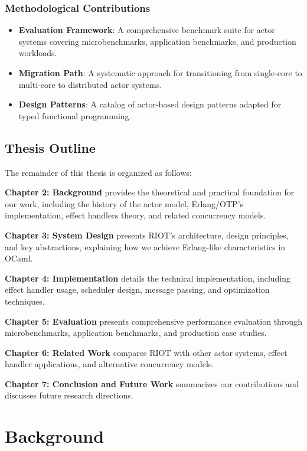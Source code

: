 \documentclass[12pt,a4paper]{report}
\begin{document}
\subsection{Methodological Contributions}

\begin{itemize}
\item \textbf{Evaluation Framework}: A comprehensive benchmark suite for actor systems covering microbenchmarks, application benchmarks, and production workloads.

\item \textbf{Migration Path}: A systematic approach for transitioning from single-core to multi-core to distributed actor systems.

\item \textbf{Design Patterns}: A catalog of actor-based design patterns adapted for typed functional programming.
\end{itemize}

\section{Thesis Outline}

The remainder of this thesis is organized as follows:

\textbf{Chapter 2: Background} provides the theoretical and practical foundation for our work, including the history of the actor model, Erlang/OTP's implementation, effect handlers theory, and related concurrency models.

\textbf{Chapter 3: System Design} presents RIOT's architecture, design principles, and key abstractions, explaining how we achieve Erlang-like characteristics in OCaml.

\textbf{Chapter 4: Implementation} details the technical implementation, including effect handler usage, scheduler design, message passing, and optimization techniques.

\textbf{Chapter 5: Evaluation} presents comprehensive performance evaluation through microbenchmarks, application benchmarks, and production case studies.

\textbf{Chapter 6: Related Work} compares RIOT with other actor systems, effect handler applications, and alternative concurrency models.

\textbf{Chapter 7: Conclusion and Future Work} summarizes our contributions and discusses future research directions.

\chapter{Background}
\end{document}
